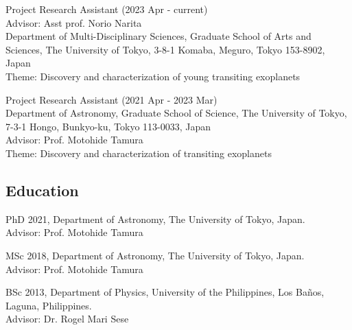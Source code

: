 \documentclass[11pt,letterpaper]{article}
\begin{document}
\begin{list}{}{\cvlist}
    \item
        Project Research Assistant (2023 Apr - current) \\
        Advisor: Asst prof. Norio Narita \\
        Department of Multi-Disciplinary Sciences, Graduate School of Arts and Sciences, The University of Tokyo, 3-8-1 Komaba, Meguro, Tokyo 153-8902, Japan \\
        Theme: Discovery and characterization of young transiting exoplanets \\

    \item
        Project Research Assistant (2021 Apr - 2023 Mar) \\
        Department of Astronomy, Graduate School of Science, The University of Tokyo, 7-3-1 Hongo, Bunkyo-ku, Tokyo 113-0033, Japan \\
        Advisor: Prof. Motohide Tamura \\
        Theme: Discovery and characterization of transiting exoplanets \\
\end{list}

\subsection{Education}
\begin{list}{}{\cvlist}
\item
        PhD 2021, Department of Astronomy, The University of Tokyo, Japan.\\Advisor: Prof. Motohide Tamura
\item
        MSc 2018, Department of Astronomy, The University of Tokyo, Japan.\\Advisor: Prof. Motohide Tamura
\item
        BSc 2013, Department of Physics, University of the Philippines, Los Ba\~nos, Laguna, Philippines.\\Advisor: Dr. Rogel Mari Sese      
\end{list}
\end{document}
